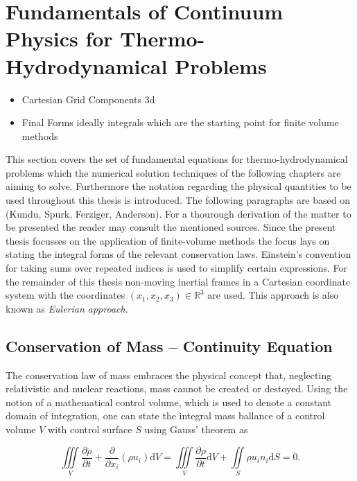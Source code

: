 
  \section{Fundamentals of Continuum Physics for Thermo-Hydrodynamical Problems}

    \begin{itemize}
        \item Cartesian Grid Components 3d
        \item Final Forms ideally integrals which are the starting point for finite volume methods
      \end{itemize}

      This section covers the set of fundamental equations for thermo-hydrodynamical problems which the numerical solution techniques of the following chapters are aiming to solve. Furthermore the notation regarding the physical quantities to be used throughout this thesis is introduced. The following paragraphs are based on (Kundu, Spurk, Ferziger, Anderson). For a thourough derivation of the matter to be presented the reader may consult the mentioned sources. Since the present thesis focusses on the application of finite-volume methods the focus lays on stating the integral forms of the relevant conservation laws. Einstein's convention for taking sums over repeated indices is used to simplify certain expressions. For the remainder of this thesis non-moving inertial frames in a Cartesian coordinate system with the coordinates \( (x_1,x_2,x_3) \in \mathbb{R}^3\) are used. This approach is also known as \textit{Eulerian approach}. 

    \subsection{Conservation of Mass -- Continuity Equation}

    The conservation law of mass embraces the physical concept that, neglecting relativistic and nuclear reactions, mass cannot be created or destoyed. Using the notion of a mathematical control volume, which is used to denote a constant domain of integration, one can state the integral mass ballance of a control volume \(V\) with control surface \(S\) using Gauss' theorem as

    \begin{displaymath}
      \iiint\limits_V \frac{\partial \rho}{\partial t} + \frac{\partial}{\partial x_i}\left( \rho u_i \right) \mathrm{d}V 
      =  \iiint\limits_V \frac{\partial \rho}{\partial t} \mathrm{d}V + \iint\limits_S \rho u_i n_i \mathrm{d}S
      = 0.
    \end{displaymath}

